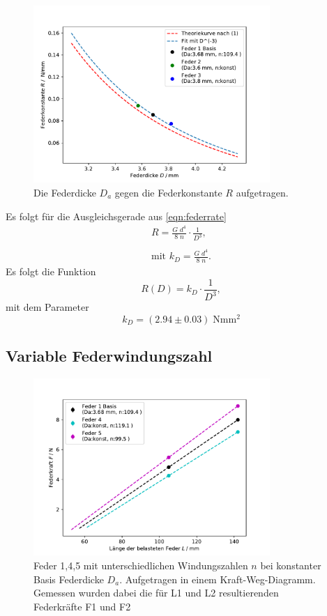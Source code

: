 \begin{figure}[H]
  \center
  \includegraphics[width=0.8\textwidth]{plots/dicke_konstante_dia.pdf}
  \caption{Die Federdicke $D_a$ gegen die Federkonstante $R$ aufgetragen.}
  \label{fig:R_D_dia}
\end{figure}

Es folgt für die Ausgleichsgerade aus \ref{eqn:federrate}
\begin{align*}
  R=\frac{G\;d^4}{8\;n}\cdot \frac{1}{D^3}, \\\\  
  \text{mit }k_D =\frac{G\;d^4}{8\;n}.
\end{align*}
Es folgt die Funktion
\begin{equation*}
  R(D)=k_D \cdot \frac{1}{D^3},
\end{equation*}
mit dem Parameter
\begin{equation*}
  k_D=(2.94 \pm 0.03) \;\si{\N\mm\squared}
\end{equation*}


\subsection{Variable Federwindungszahl}
\label{sec:federwindungen}
\begin{figure}[H]
    \center
    \includegraphics[width=0.8\textwidth]{plots/n_kraftweg_dia.pdf}
    \caption{Feder 1,4,5 mit unterschiedlichen Windungszahlen $n$ bei konstanter Basis Federdicke $D_a$.
    Aufgetragen in einem Kraft-Weg-Diagramm. Gemessen wurden dabei die für L1
    und L2 resultierenden Federkräfte F1 und F2}
\end{figure}

